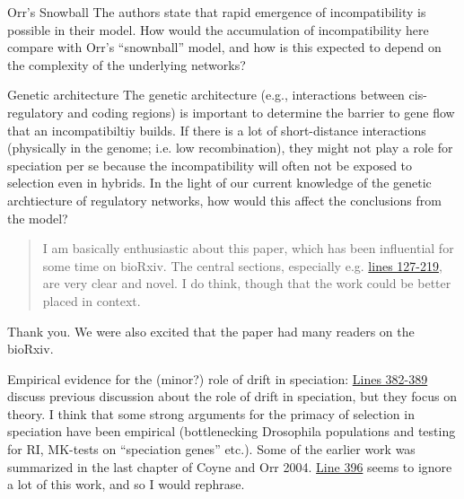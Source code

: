 \reply{
}

\begin{point}{Orr's Snowball}
The authors state that rapid emergence of incompatibility is possible in their model. How would the accumulation of incompatibility here compare with Orr’s ``snownball'' model, and how is this expected to depend on the complexity of the underlying networks?
\end{point}

\reply{
}

\begin{point}{Genetic architecture}
The genetic architecture (e.g., interactions between cis-regulatory and coding regions) is important to determine the barrier to gene flow that an incompatibiltiy builds. If there is a lot of short-distance interactions (physically in the genome; i.e. low recombination), they might not play a role for speciation per se because the incompatibility will often not be exposed to selection even in hybrids. In the light of our current knowledge of the genetic archtiecture of regulatory networks, how would this affect the conclusions from the model?
\end{point}

\reply{
}

\begin{quote}
  I am basically enthusiastic about this paper, which has been influential for some time on bioRxiv. The central sections, especially e.g. \hyperlink{rev1:1}{lines 127-219}, are very clear and novel. I do think, though that the work could be better placed in context.
\end{quote}

Thank you. We were also excited that the paper had many readers on the bioRxiv. 

\begin{point}{Empirical evidence for the (minor?) role of drift in speciation:}
%
  \hyperlink{rev1:2}{Lines 382-389} discuss previous discussion about the role of drift in speciation, but they focus on theory. I think that some strong arguments for the primacy of selection in speciation have been empirical (bottlenecking Drosophila populations and testing for RI, MK-tests on ``speciation genes'' etc.). Some of the earlier work was summarized in the last chapter of Coyne and Orr 2004. \hyperlink{rev1:3}{Line 396} seems to ignore a lot of this work, and so I would rephrase.
\end{point}

